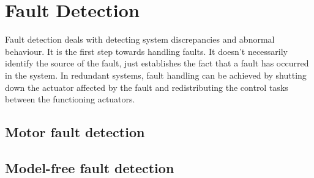 \section{Fault Detection}

Fault detection deals with detecting system discrepancies and abnormal behaviour. It is the first step towards handling faults. It doesn't necessarily identify the source of the fault, just establishes the fact that a fault has occurred in the system. In redundant systems, fault handling can be achieved by shutting down the actuator affected by the fault and redistributing the control tasks between the functioning actuators.


\subsection{Motor fault detection}


\subsection{Model-free fault detection}















